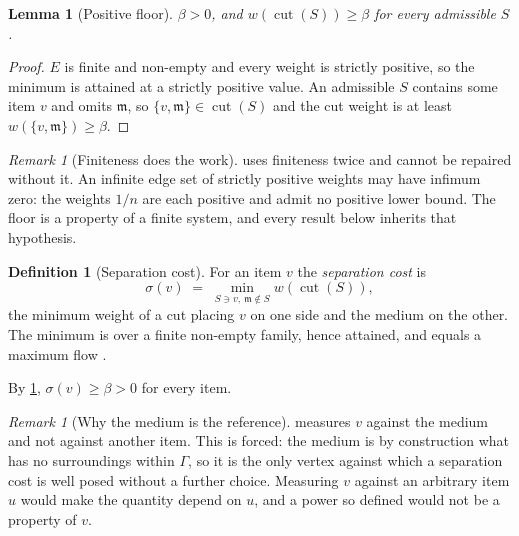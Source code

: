 \documentclass[11pt,twocolumn,a4paper]{article}
\theoremstyle{plain}
\newtheorem{lemma}[theorem]{Lemma}
\theoremstyle{definition}
\newtheorem{definition}[theorem]{Definition}
\theoremstyle{remark}
\newtheorem{remark}[theorem]{Remark}
\newcommand{\Gph}{\Gamma}
\newcommand{\med}{\mathfrak{m}}
\newcommand{\cut}{\operatorname{cut}}
\newcommand{\wt}{w}
\newcommand{\flo}{\beta}
\newcommand{\sepc}{\sigma}
\begin{document}
\begin{lemma}[Positive floor]
\label{lem:floor}
$\flo>0$, and $\wt(\cut(S))\ge\flo$ for every admissible $S$.
\end{lemma}

\begin{proof}
$E$ is finite and non-empty and every weight is strictly positive, so the
minimum is attained at a strictly positive value. An admissible $S$ contains
some item $v$ and omits $\med$, so $\{v,\med\}\in\cut(S)$ and the cut weight is
at least $\wt(\{v,\med\})\ge\flo$.
\end{proof}

\begin{remark}[Finiteness does the work]
\label{rem:finiteness}
 uses finiteness twice and cannot be repaired without it. An
infinite edge set of strictly positive weights may have infimum zero: the
weights $1/n$ are each positive and admit no positive lower bound. The floor is
a property of a finite system, and every result below inherits that hypothesis.
\end{remark}

\begin{definition}[Separation cost]
\label{def:sepcost}
For an item $v$ the \emph{separation cost} is
\begin{equation}
\sepc(v)\;=\;\min_{S\ni v,\ \med\notin S}\wt(\cut(S)),
\label{eq:sepcost}
\end{equation}
the minimum weight of a cut placing $v$ on one side and the medium on the
other. The minimum is over a finite non-empty family, hence attained, and
equals a maximum flow \citep{fordfulkerson1956}.
\end{definition}

By \cref{lem:floor}, $\sepc(v)\ge\flo>0$ for every item.

\begin{remark}[Why the medium is the reference]
\label{rem:medium-ref}
 measures $v$ against the medium and not against another item.
This is forced: the medium is by construction what has no surroundings within
$\Gph$, so it is the only vertex against which a separation cost is well posed
without a further choice. Measuring $v$ against an arbitrary item $u$ would
make the quantity depend on $u$, and a power so defined would not be a property
of $v$.
\end{remark}
\end{document}
